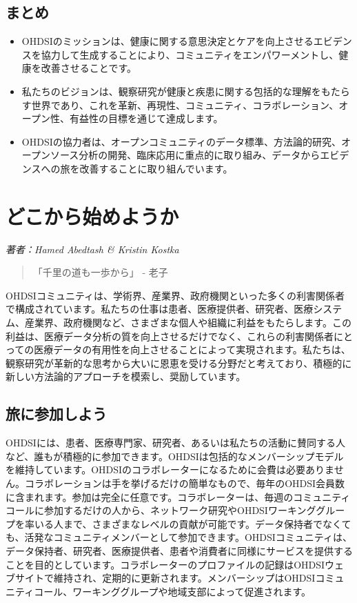 \documentclass[
  11pt]{book}
\makeatletter
\newenvironment{kframe}{%
\medskip{}
\setlength{\fboxsep}{.8em}
 \def\at@end@of@kframe{}%
 \ifinner\ifhmode%
  \def\at@end@of@kframe{\end{minipage}}%
  \begin{minipage}{\columnwidth}%
 \fi\fi%
 \def\FrameCommand##1{\hskip\@totalleftmargin \hskip-\fboxsep
 \colorbox{myShadeColor}{##1}\hskip-\fboxsep
     \hskip-\linewidth \hskip-\@totalleftmargin \hskip\columnwidth}%
 \MakeFramed {\advance\hsize-\width
   \@totalleftmargin\z@ \linewidth\hsize
   \@setminipage}}%
 {\par\unskip\endMakeFramed%
 \at@end@of@kframe}
\newenvironment{rmdblock}[1]
  {
  \begin{itemize}
  \renewcommand{\labelitemi}{
    \raisebox{-.7\height}[0pt][0pt]{
      {\setkeys{Gin}{width=3em,keepaspectratio}\texttt{[image: images/\#1]}}
    }
  }
  \setlength{\fboxsep}{1em}
  \begin{kframe}
  \item
  }
  {
  \end{kframe}
  \end{itemize}
  }
\newenvironment{rmdsummary}
  {\begin{rmdblock}{summary}}
  {\end{rmdblock}}
\theoremstyle{definition}
\theoremstyle{definition}
\theoremstyle{definition}
\theoremstyle{definition}
\theoremstyle{remark}
\makeatother
\begin{document}
\section{まとめ}\label{ux307eux3068ux3081}

\begin{rmdsummary}
\begin{itemize}
\item
  OHDSIのミッションは、健康に関する意思決定とケアを向上させるエビデンスを協力して生成することにより、コミュニティをエンパワーメントし、健康を改善させることです。
\item
  私たちのビジョンは、観察研究が健康と疾患に関する包括的な理解をもたらす世界であり、これを革新、再現性、コミュニティ、コラボレーション、オープン性、有益性の目標を通じて達成します。
\item
  OHDSIの協力者は、オープンコミュニティのデータ標準、方法論的研究、オープンソース分析の開発、臨床応用に重点的に取り組み、データからエビデンスへの旅を改善することに取り組んでいます。
\end{itemize}
\end{rmdsummary}

\chapter{どこから始めようか}\label{WhereToBegin}

\emph{著者：Hamed Abedtash \& Kristin Kostka}

\begin{quote}
「千里の道も一歩から」 - 老子
\end{quote}

OHDSIコミュニティは、学術界、産業界、政府機関といった多くの利害関係者で構成されています。私たちの仕事は患者、医療提供者、研究者、医療システム、産業界、政府機関など、さまざまな個人や組織に利益をもたらします。この利益は、医療データ分析の質を向上させるだけでなく、これらの利害関係者にとっての医療データの有用性を向上させることによって実現されます。私たちは、観察研究が革新的な思考から大いに恩恵を受ける分野だと考えており、積極的に新しい方法論的アプローチを模索し、奨励しています。

\section{旅に参加しよう}\label{ux65c5ux306bux53c2ux52a0ux3057ux3088ux3046}

OHDSIには、患者、医療専門家、研究者、あるいは私たちの活動に賛同する人など、誰もが積極的に参加できます。OHDSIは包括的なメンバーシップモデルを維持しています。OHDSIのコラボレーターになるために会費は必要ありません。コラボレーションは手を挙げるだけの簡単なもので、毎年のOHDSI会員数に含まれます。参加は完全に任意です。コラボレーターは、毎週のコミュニティコールに参加するだけの人から、ネットワーク研究やOHDSIワーキンググループを率いる人まで、さまざまなレベルの貢献が可能です。データ保持者でなくても、活発なコミュニティメンバーとして参加できます。OHDSIコミュニティは、データ保持者、研究者、医療提供者、患者や消費者に同様にサービスを提供することを目的としています。コラボレーターのプロファイルの記録はOHDSIウェブサイトで維持され、定期的に更新されます。メンバーシップはOHDSIコミュニティコール、ワーキンググループや地域支部によって促進されます。
\end{document}

